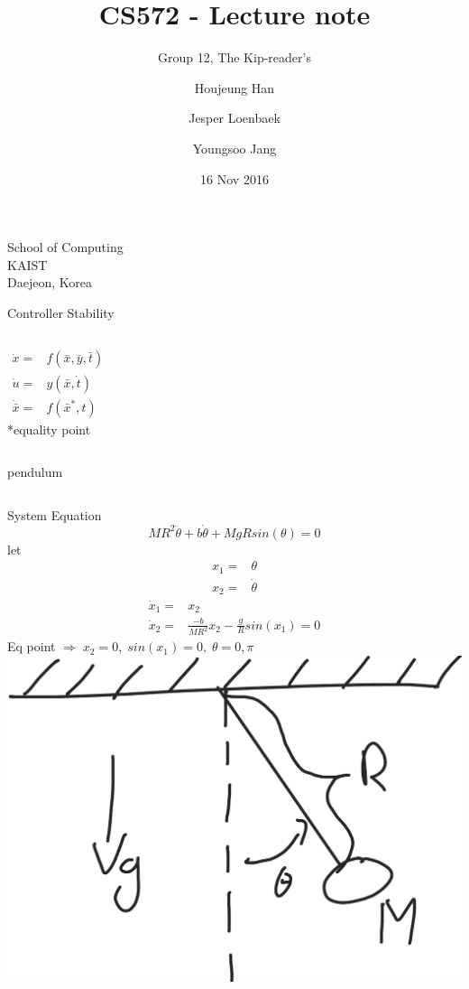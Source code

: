 \documentclass{beamer}
\begin{document}
\title{CS572 - Lecture note}
\subtitle{Group 12, The Kip-reader's}
\author{Houjeung Han \and Jesper Loenbaek \and Youngsoo Jang}
\institute%
{
    School of Computing\\
    KAIST\\
    Daejeon, Korea
}

\date{16 Nov 2016}
\frame{\titlepage}

\begin{frame}{Controller Stability}
    \begin{columns}[T]
    \begin{align*}
        \dot{x} =& f(\bar{x},\bar{y},\bar{t})\\
        \dot{u} =& y(\bar{x},\dot{t})\\
        \dot{\bar{x}} =& f(\bar{x}^*,t)
    \end{align*}
    *equality point
    \end{columns}
\end{frame}

\begin{frame}{pendulum}
    \begin{columns}[T]
    System Equation
    $$MR^2 \ddot{\theta} + b\dot{\theta} + MgRsin(\theta)=0$$
    let
    \vspace*{-0.5cm}
    \begin{align*}
        x_1 =& \theta\\
        x_2 =& \dot{\theta}
    \end{align*}
    \vspace*{-1cm}
    \begin{align*}
        \dot{x}_1 =& x_2\\
        \dot{x}_2 =& \frac{-b}{MR^2}x_2-\frac{g}{R}sin(x_1)=0
    \end{align*}
    Eq point $\Rightarrow \; x_2=0,\; sin(x_1)=0,\; \theta=0,\pi$
        \includegraphics[width=\textwidth]{fig/pendulum.png}   
    \end{columns}
\end{frame}
\end{document}
